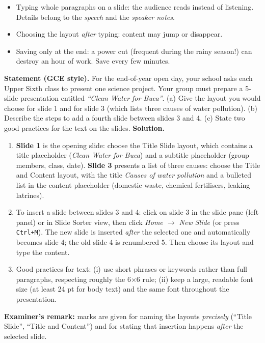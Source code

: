 \documentclass[11pt]{article}
\newcommand{\cle}[1]{{\popxbold\color{popdark}#1}}
\begin{document}
\begin{attention}
\begin{itemize}
\item Typing whole paragraphs on a slide: the audience reads instead of listening. Details belong to the \emph{speech} and the \emph{speaker notes}.
\item Choosing the layout \emph{after} typing: content may jump or disappear.
\item Saving only at the end: a power cut (frequent during the rainy season!) can destroy an hour of work. Save every few minutes.
\end{itemize}
\end{attention}

\begin{exoresolu}
\textbf{Statement (GCE style).} For the end-of-year open day, your school asks each Upper Sixth class to present one science project. Your group must prepare a 5-slide presentation entitled \emph{``Clean Water for Buea''}. (a) Give the layout you would choose for slide 1 and for slide 3 (which lists three causes of water pollution). (b) Describe the steps to add a fourth slide between slides 3 and 4. (c) State two good practices for the text on the slides.
\tcblower
\textbf{Solution.}
\begin{enumerate}
\item[(a)] \textbf{Slide 1} is the opening slide: choose the \cle{Title Slide} layout, which contains a title placeholder (\emph{Clean Water for Buea}) and a subtitle placeholder (group members, class, date). \textbf{Slide 3} presents a list of three causes: choose the \cle{Title and Content} layout, with the title \emph{Causes of water pollution} and a bulleted list in the content placeholder (domestic waste, chemical fertilisers, leaking latrines).
\item[(b)] To insert a slide between slides 3 and 4: click on slide 3 in the slide pane (left panel) or in Slide Sorter view, then click \emph{Home $\rightarrow$ New Slide} (or press \texttt{Ctrl+M}). The new slide is inserted \emph{after} the selected one and automatically becomes slide 4; the old slide 4 is renumbered 5. Then choose its layout and type the content.
\item[(c)] Good practices for text: (i) use short phrases or keywords rather than full paragraphs, respecting roughly the 6$\times$6 rule; (ii) keep a large, readable font size (at least 24 pt for body text) and the same font throughout the presentation.
\end{enumerate}
\textbf{Examiner's remark:} marks are given for naming the layouts \emph{precisely} (``Title Slide'', ``Title and Content'') and for stating that insertion happens \emph{after} the selected slide.
\end{exoresolu}
\end{document}

